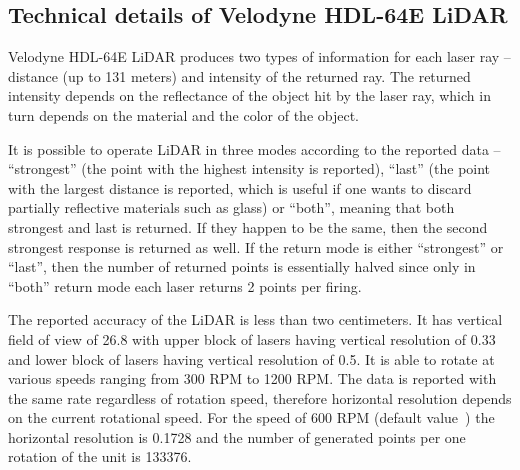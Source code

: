 \subsection{Technical details of Velodyne HDL-64E LiDAR}

Velodyne HDL-64E LiDAR produces two types of information for each laser ray -- distance (up to 131 meters) and intensity of the returned ray. The returned intensity depends on the reflectance of the object hit by the laser ray, which in turn depends on the material and the color of the object.

It is possible to operate LiDAR in three modes according to the reported data -- ``strongest'' (the point with the highest intensity is reported), ``last'' (the point with the largest distance is reported, which is useful if one wants to discard partially reflective materials such as glass) or ``both'', meaning that both strongest and last is returned. If they happen to be the same, then the second strongest response is returned as well. If the return mode is either ``strongest'' or ``last'', then the number of returned points is essentially halved since only in ``both'' return mode each laser returns 2 points per firing.

The reported accuracy of the LiDAR is less than two centimeters. It has vertical field of view of 26.8\degree{} with upper block of lasers having vertical resolution of 0.33\degree{} and lower block of lasers having vertical resolution of 0.5\degree. It is able to rotate at various speeds ranging from 300 RPM to 1200 RPM. The data is reported with the same rate regardless of rotation speed, therefore horizontal resolution depends on the current rotational speed. For the speed of 600 RPM (default value~\cite{velomanual}) the horizontal resolution is 0.1728\degree{} and the number of generated points per one rotation of the unit is 133376.
